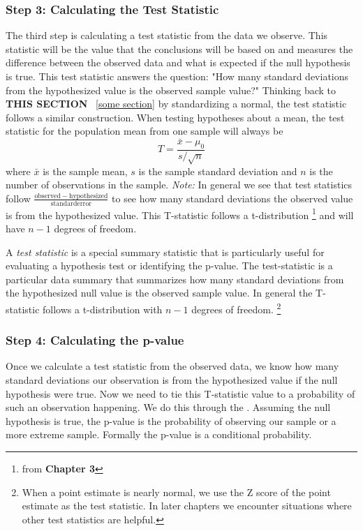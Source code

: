 \subsubsection{Step 3: Calculating the Test Statistic}
The third step is calculating a test statistic from the data we observe. This statistic will be the value that the conclusions will be based on and measures the difference between the observed data and what is expected if the null hypothesis is true. This test statistic answers the question: "How many standard deviations from the hypothesized value is the observed sample value?" Thinking back to \textbf{THIS SECTION} ~\ref{some section} by standardizing a normal, the test statistic follows a similar construction. When testing hypotheses about a mean, the test statistic for the population mean from one sample will always be \[T=\frac{\bar{x}-\mu_0}{s/\sqrt{n}}\] where $\bar{x}$ is the sample mean, $s$ is the sample standard deviation and $n$ is the number of observations in the sample.
\emph{Note:} In general we see that test statistics follow $\frac{\mathrm{observed-hypothesized}}{\mathrm{standard error}}$ to see how many standard deviations the observed value is from the hypothesized value. 
This T-statistic follows a t-distribution \footnote{ from \textbf{Chapter 3}} and will have $n-1$ degrees of freedom. 

\begin{termBox}{
A \emph{test statistic} is a special summary statistic that is particularly useful for evaluating a hypothesis test or identifying the p-value. The test-statistic is a particular data summary that summarizes how many standard deviations from the hypothesized null value is the observed sample value. In general the T-statistic follows a t-distribution with $n-1$ degrees of freedom. \footnote{When a point estimate is nearly normal, we use the Z score of the point estimate as the test statistic. In later chapters we encounter situations where other test statistics are helpful.}}
\end{termBox}

\subsubsection{Step 4: Calculating the p-value}
Once we calculate a test statistic from the observed data, we know how many standard deviations our observation is from the hypothesized value if the null hypothesis were true. Now we need to tie this T-statistic value to a probability of such an observation happening. We do this through the . Assuming the null hypothesis is true, the p-value is the probability of observing our sample or a more extreme sample. Formally the p-value is a conditional probability.

